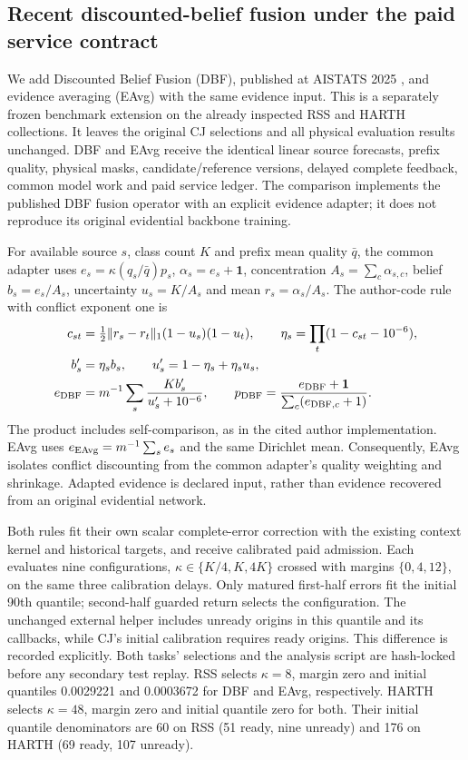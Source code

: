 \documentclass[10pt]{article}
\begin{document}
\subsection{Recent discounted-belief fusion under the paid service contract}
\label{sec:dbf2025-service}
We add Discounted Belief Fusion (DBF), published at AISTATS 2025
\cite{dbf2025}, and evidence averaging (EAvg) with the same evidence input.
This is a separately frozen benchmark extension on the already inspected
RSS and HARTH collections. It leaves the original CJ selections and all
physical evaluation results unchanged. DBF and EAvg receive the identical
linear source forecasts, prefix quality, physical masks, candidate/reference
versions, delayed complete feedback, common model work and paid service
ledger. The comparison implements the published DBF fusion operator with
an explicit evidence adapter; it does not reproduce its original evidential
backbone training.

For available source $s$, class count $K$ and prefix mean quality $\bar q$,
the common adapter uses $e_s=\kappa(q_s/\bar q)p_s$,
$\alpha_s=e_s+\mathbf1$, concentration $A_s=\sum_c\alpha_{s,c}$,
belief $b_s=e_s/A_s$, uncertainty $u_s=K/A_s$ and mean
$r_s=\alpha_s/A_s$. The author-code rule with conflict exponent one is
\begin{equation}
\begin{aligned}
 c_{st}&=\tfrac12\|r_s-r_t\|_1(1-u_s)(1-u_t),\qquad
 \eta_s=\prod_t(1-c_{st}-10^{-6}),\\
 b'_s&=\eta_sb_s,\qquad u'_s=1-\eta_s+\eta_su_s,\\
 e_{\rm DBF}&=m^{-1}\sum_s\frac{K b'_s}{u'_s+10^{-6}},\qquad
 p_{\rm DBF}=\frac{e_{\rm DBF}+\mathbf1}{\sum_c(e_{{\rm DBF},c}+1)}.
\end{aligned}
\label{eq:dbf-service-adaptation}
\end{equation}
The product includes self-comparison, as in the cited author implementation.
EAvg uses $e_{\rm EAvg}=m^{-1}\sum_se_s$ and the same Dirichlet mean.
Consequently, EAvg isolates conflict discounting from the common adapter's
quality weighting and shrinkage. Adapted evidence is declared input,
rather than evidence recovered from an original evidential network.

Both rules fit their own scalar complete-error correction with the existing
context kernel and historical targets, and receive calibrated paid admission.
Each evaluates nine configurations,
$\kappa\in\{K/4,K,4K\}$ crossed with margins $\{0,4,12\}$, on the same
three calibration delays. Only matured first-half errors fit the initial
90th quantile; second-half guarded return selects the configuration. The
unchanged external helper includes unready origins in this quantile and
its callbacks, while CJ's initial calibration requires ready origins.
This difference is recorded explicitly. Both tasks' selections and the
analysis script are hash-locked before any secondary test replay.
RSS selects $\kappa=8$, margin zero and initial quantiles 0.0029221
and 0.0003672 for DBF and EAvg, respectively. HARTH selects $\kappa=48$,
margin zero and initial quantile zero for both. Their initial quantile
denominators are 60 on RSS (51 ready, nine unready) and 176 on HARTH
(69 ready, 107 unready).
\end{document}

